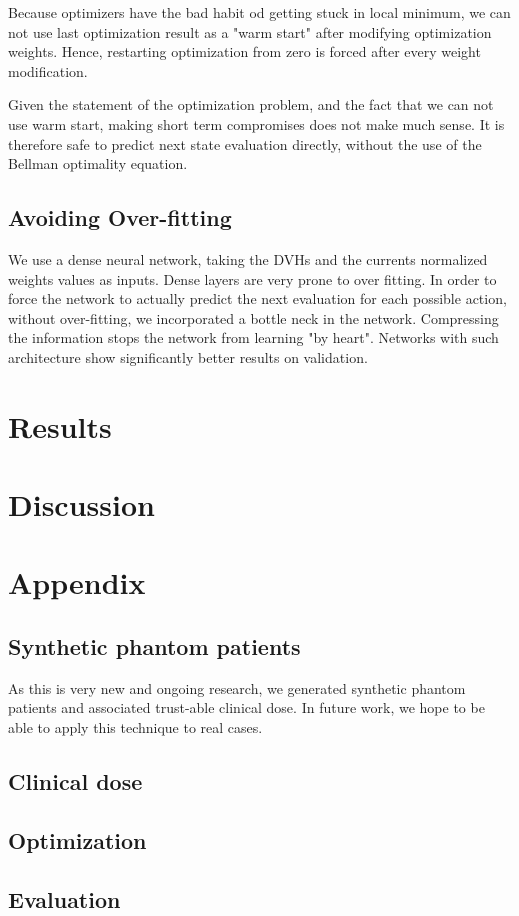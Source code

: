 Because optimizers have the bad habit od getting stuck in local minimum, we can not use last optimization result as a "warm start" after modifying optimization weights.
Hence, restarting optimization from zero is forced after every weight modification.

Given the statement of the optimization problem, and the fact that we can not use warm start, making short term compromises does not make much sense.
It is therefore safe to predict next state evaluation directly, without the use of the Bellman optimality equation.

\subsection{Avoiding Over-fitting}
We use a dense neural network, taking the DVHs and the currents normalized weights values as inputs.
Dense layers are very prone to over fitting.
In order to force the network to actually predict the next evaluation for each possible action, without over-fitting, we incorporated a bottle neck in the network.
Compressing the information stops the network from learning "by heart".
Networks with such architecture show significantly better results on validation.


\section{Results}

\section{Discussion}


\section*{Appendix}

\subsection*{Synthetic phantom patients}
As this is very new and ongoing research, we generated synthetic phantom patients and associated trust-able clinical dose.
In future work, we hope to be able to apply this technique to real cases.

\subsection*{Clinical dose}

\subsection*{Optimization}

\subsection*{Evaluation}

